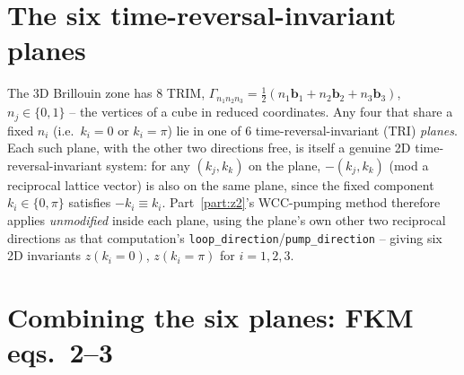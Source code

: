 \documentclass[11pt]{article}
\begin{document}
\section{The six time-reversal-invariant planes}

The 3D Brillouin zone has 8 TRIM, $\Gamma_{n_1n_2n_3} = \tfrac12(n_1\mathbf
b_1+n_2\mathbf b_2+n_3\mathbf b_3)$, $n_j\in\{0,1\}$ -- the vertices of a cube in
reduced coordinates. Any four that share a fixed $n_i$ (i.e.\ $k_i=0$ or $k_i=\pi$) lie
in one of 6 time-reversal-invariant (TRI) \emph{planes}. Each such plane, with the
other two directions free, is itself a genuine 2D time-reversal-invariant system: for
any $(k_j,k_k)$ on the plane, $-(k_j,k_k)$ (mod a reciprocal lattice vector) is also on
the same plane, since the fixed component $k_i\in\{0,\pi\}$ satisfies $-k_i\equiv k_i$.
Part~\ref{part:z2}'s WCC-pumping method therefore applies \emph{unmodified} inside each
plane, using the plane's own other two reciprocal directions as that computation's
\texttt{loop\_direction}/\texttt{pump\_direction} -- giving six 2D invariants
$z(k_i{=}0)$, $z(k_i{=}\pi)$ for $i=1,2,3$.

\section{Combining the six planes: FKM eqs.\ 2--3}
\end{document}
